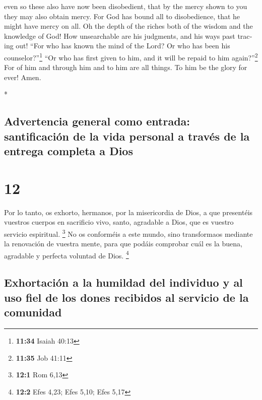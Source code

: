 \begin{paracol}{2}
\begin{otherlanguage}{english}
 even so these also have now been disobedient, that by
the mercy shown to you they may also obtain mercy.  For
God has bound all to disobedience, that he might have mercy on all.
 Oh the depth of the riches both of the wisdom and the
knowledge of God! How unsearchable are his judgments, and his ways past
tracing out!  ``For who has known the mind of the Lord?
Or who has been his counselor?''\footnote{\textbf{11:34} Isaiah 40:13}
 ``Or who has first given to him, and it will be repaid
to him again?''\footnote{\textbf{11:35} Job 41:11}  For
of him and through him and to him are all things. To him be the glory
for ever! Amen.

\end{otherlanguage}

\switchcolumn[0]*

\hypertarget{advertencia-general-como-entrada-santificaciuxf3n-de-la-vida-personal-a-travuxe9s-de-la-entrega-completa-a-dios}{%
\subsection{Advertencia general como entrada: santificación de la vida
personal a través de la entrega completa a
Dios}\label{advertencia-general-como-entrada-santificaciuxf3n-de-la-vida-personal-a-travuxe9s-de-la-entrega-completa-a-dios}}

\hypertarget{section-22}{%
\section{12}\label{section-22}}

 Por lo tanto, os exhorto, hermanos, por la misericordia
de Dios, a que presentéis vuestros cuerpos en sacrificio vivo, santo,
agradable a Dios, que es vuestro servicio espiritual. \footnote{\textbf{12:1}
  Rom 6,13}  No os conforméis a este mundo, sino
transformaos mediante la renovación de vuestra mente, para que podáis
comprobar cuál es la buena, agradable y perfecta voluntad de Dios.
\footnote{\textbf{12:2} Efes 4,23; Efes 5,10; Efes 5,17}

\hypertarget{exhortaciuxf3n-a-la-humildad-del-individuo-y-al-uso-fiel-de-los-dones-recibidos-al-servicio-de-la-comunidad}{%
\subsection{Exhortación a la humildad del individuo y al uso fiel de los
dones recibidos al servicio de la
comunidad}\label{exhortaciuxf3n-a-la-humildad-del-individuo-y-al-uso-fiel-de-los-dones-recibidos-al-servicio-de-la-comunidad}}


\end{paracol}
